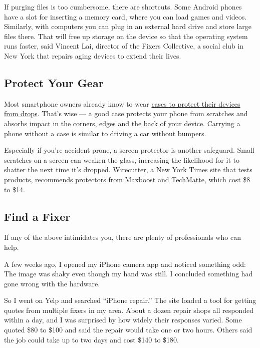 If purging files is too cumbersome, there are shortcuts. Some Android
phones have a slot for inserting a memory card, where you can load games
and videos. Similarly, with computers you can plug in an external hard
drive and store large files there. That will free up storage on the
device so that the operating system runs faster, said Vincent Lai,
director of the Fixers Collective, a social club in New York that
repairs aging devices to extend their lives.

\hypertarget{protect-your-gear}{%
\subsection{Protect Your Gear}\label{protect-your-gear}}

Most smartphone owners already know to wear
\href{https://www.npd.com/wps/portal/npd/us/news/press-releases/one-in-four-smartphone-owners-dont-use-a-case-to-protect-their-phone-according-to-npd/}{cases
to protect their devices from drops}. That's wise --- a good case
protects your phone from scratches and absorbs impact in the corners,
edges and the back of your device. Carrying a phone without a case is
similar to driving a car without bumpers.

Especially if you're accident prone, a screen protector is another
safeguard. Small scratches on a screen can weaken the glass, increasing
the likelihood for it to shatter the next time it's dropped. Wirecutter,
a New York Times site that tests products,
\href{https://www.nytimes3xbfgragh.onion/wirecutter/reviews/best-iphone-x-screen-protectors/}{recommends
protectors} from Maxboost and TechMatte, which cost \$8 to \$14.

\hypertarget{find-a-fixer}{%
\subsection{Find a Fixer}\label{find-a-fixer}}

If any of the above intimidates you, there are plenty of professionals
who can help.

A few weeks ago, I opened my iPhone camera app and noticed something
odd: The image was shaky even though my hand was still. I concluded
something had gone wrong with the hardware.

So I went on Yelp and searched ``iPhone repair.'' The site loaded a tool
for getting quotes from multiple fixers in my area. About a dozen repair
shops all responded within a day, and I was surprised by how widely
their responses varied. Some quoted \$80 to \$100 and said the repair
would take one or two hours. Others said the job could take up to two
days and cost \$140 to \$180.

